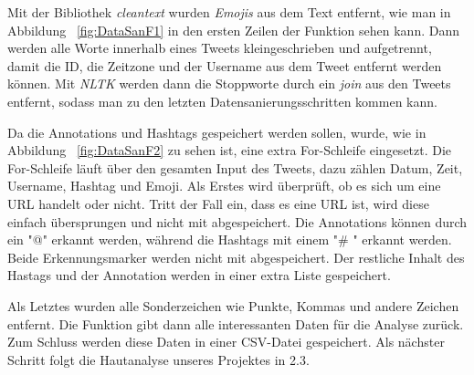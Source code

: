 
Mit der Bibliothek \textit{cleantext} wurden \textit{Emojis} aus dem Text entfernt, wie man in Abbildung ~\ref{fig:DataSanF1} in den ersten Zeilen der Funktion sehen kann. Dann werden alle Worte innerhalb eines Tweets kleingeschrieben und aufgetrennt, damit die ID, die Zeitzone und der Username aus dem Tweet entfernt werden können. Mit \textit{NLTK} werden dann die Stoppworte durch ein \textit{join} aus den Tweets entfernt, sodass man zu den letzten Datensanierungsschritten kommen kann.
	 
	
Da die Annotations und Hashtags gespeichert werden sollen, wurde, wie in Abbildung ~\ref{fig:DataSanF2} zu sehen ist, eine extra For-Schleife eingesetzt. Die For-Schleife läuft über den gesamten Input des Tweets, dazu zählen Datum, Zeit, Username, Hashtag und Emoji. Als Erstes wird überprüft, ob es sich um eine URL handelt oder nicht. Tritt der Fall ein, dass es eine URL ist, wird diese einfach übersprungen und nicht mit abgespeichert. Die Annotations können durch ein "@" erkannt werden, während die Hashtags mit einem "\# " erkannt werden. Beide Erkennungsmarker werden nicht mit abgespeichert. Der restliche Inhalt des Hastags und der Annotation werden in einer extra Liste gespeichert.


Als Letztes wurden alle Sonderzeichen wie Punkte, Kommas und andere Zeichen entfernt. Die Funktion gibt dann alle interessanten Daten für die Analyse zurück. Zum Schluss werden diese Daten in einer CSV-Datei gespeichert. Als nächster Schritt folgt die Hautanalyse unseres Projektes in 2.3.